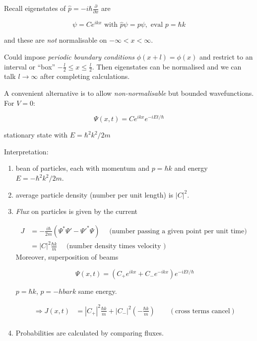 \documentclass[a4paper]{article}
\begin{document}
Recall eigenstates of $ \hat{p} = - i \hbar \frac{\partial }{\partial x} $ are 

\[ \psi = C e^{i k x} \text{ with } \hat{p} \psi = p \psi, \text{ eval } p = \hbar k \]

and these are \emph{not} normalisable on $ - \infty < x < \infty $.

Could impose \emph{periodic boundary conditions} $ \phi(x + l) = \phi(x) $ and restrict to an interval or ``box'' $ - \frac{l}{2} \leq x \leq \frac{l}{2} $. Then eigenstates can be normalised and we can talk $ l \to \infty $ after completing calculations.

A convenient alternative is to allow \emph{non-normalisable} but bounded wavefunctions. For $ V = 0 $:

\[ \Psi(x,t) = C e^{ikx} e^{-iEt/\hbar} \]

stationary state with $ E = \hbar^{2} k^{2} / 2m $

Interpretation:

\begin{enumerate}
	\item bean of particles, each with momentum and $ p = \hbar k $ and energy $ E = - \hbar^{2} k^{2} / 2m $.
	\item average particle density (number per unit length) is $ | C |^{2} $.
	\item \emph{Flux} on particles is given by the current 
	
	\begin{align*}
	J & = - \frac{i \hbar}{2m}  (  \Psi^{*} \Psi' - \Psi'^{*} \Psi ) \quad \text{ (number passing a given point per unit time) } \\
	& = | C |^{2}  \frac{\hbar k}{m}  \quad \text{ (number density times velocity ) } \end{align*}
	Moreover, superposition of beams 
	
	\[ \Psi(x,t) = (  C_{+} e^{ikx}   + C_{-}  e^{-ikx}   ) e^{-iEt/\hbar}  \]
	
	$ p = \hbar k $, $ p = -hbar k $ same energy.
	
	\begin{align*}
	\Rightarrow J(x,t) & = | C_{+} |^{2} \frac{\hbar k}{m} + | C_{-} |^{2}  \left(  - \frac{\hbar k}{m} \right) \qquad (\text{cross terms cancel})   \\
	\end{align*}
	
	\item Probabilities are calculated by comparing fluxes.
	
\end{enumerate}
\end{document}
